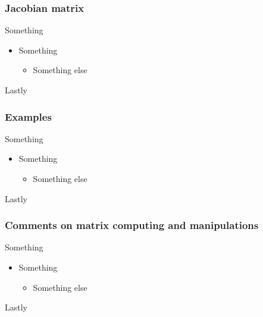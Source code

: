 \documentclass[hyperref={colorlinks=true}]{beamer}
\begin{document}

\begin{frame}%
  \frametitle{Jacobian matrix}

  Something
  
  \vspace{0.3cm}
  
  \begin{itemize}
    \item Something
    \begin{itemize}
      \item Something else 
    \end{itemize}
  \end{itemize}
  
  Lastly

\end{frame}


\begin{frame}%
  \frametitle{Examples}

  Something
  
  \vspace{0.3cm}
  
  \begin{itemize}
    \item Something
    \begin{itemize}
      \item Something else 
    \end{itemize}
  \end{itemize}
  
  Lastly

\end{frame}


\begin{frame}%
  \frametitle{Comments on matrix computing and manipulations}

  Something
  
  \vspace{0.3cm}
  
  \begin{itemize}
    \item Something
    \begin{itemize}
      \item Something else 
    \end{itemize}
  \end{itemize}
  
  Lastly

\end{frame}
\end{document}
